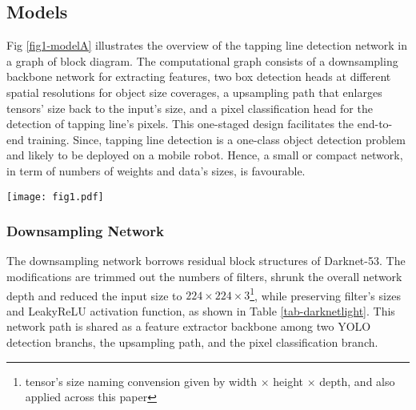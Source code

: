 \documentclass[default,pdflatex,iicol]{sn-jnl}%
\begin{document}
\subsection{Models}\label{subsec-model}
Fig \ref{fig1-modelA} illustrates the overview of the tapping line detection network in a graph of block diagram. The computational graph consists of a downsampling backbone network for extracting features, two box detection heads at different spatial resolutions for object size coverages, a upsampling path that enlarges tensors' size back to the input's size, and a pixel classification head for the detection of tapping line's pixels. This one-staged design facilitates the end-to-end training. Since, tapping line detection is a one-class object detection problem and likely to be deployed on a mobile robot. Hence, a small or compact network, in term of numbers of weights and data's sizes, is favourable.

\begin{figure*}[h]%
\centering
\texttt{[image: fig1.pdf]}
\caption{The proposed tapping line detection network, visualized in a directed grpah with blocks. Network composes of four parts, from left-to-right are Downsampling network, two YOLO detection branches, Upsampling network, and Pixel classification branch.}\label{fig1-modelA}
\end{figure*}

\subsubsection{Downsampling Network}
The downsampling network borrows residual block structures of Darknet-53. The modifications are trimmed out the numbers of filters, shrunk the overall network depth and reduced the input size to $224 \times 224 \times 3$\footnote[1]{tensor's size naming convension given by width $\times$ height $\times$ depth, and also applied across this paper}, while preserving filter's sizes and LeakyReLU activation function, as shown in Table \ref{tab-darknetlight}. This network path is shared as a feature extractor backbone among two YOLO detection branchs, the upsampling path, and the pixel classification branch.
\end{document}
